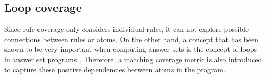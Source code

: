 
\begin{comment}
    - constraints are a special type of rule and have to be handled slightly differently because when the body of a constraint is true 
    (=normal rule coverage) this will imply false and therefore not create an answer set / create an unsatisfiable solve call -> we 
    cant check constraints the same way we check other rules
    
    - solution: (following the suggestion in the paper by \textcite{Jan+11}) remove the constraint from the program in order to check 
    for its covereage!
    
    - Definition + examples
    
    (- maybe reminder that these coverage metrics dont really care about what the output of the program is and whether its according to 
    the specification, therefore removing constraints is okay even though it might completely destroy the functionality of the program)
\end{comment}

\subsection{Loop coverage}
\label{subsec:Coverage metrics/Branch-like coverage/Loop coverage}
Since rule coverage only considers individual rules, it can not explore possible connections between rules or atoms. On the other hand, a concept that has been shown to be very important when computing answer sets is the concept of loops in answer set programs \cite{LZ04}. Therefore, a matching coverage metric is also introduced to capture these positive dependencies between atoms in the program.

